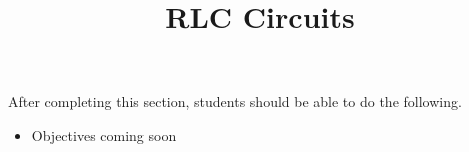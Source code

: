 \documentclass{ximera}
\title{RLC Circuits}
\begin{document}
\begin{abstract}
\end{abstract}

\maketitle

\begin{sectionOutcomes}

After completing this section, students should be able to do the following.

\begin{itemize}
	\item Objectives coming soon
\end{itemize}

\end{sectionOutcomes}
\end{document}
